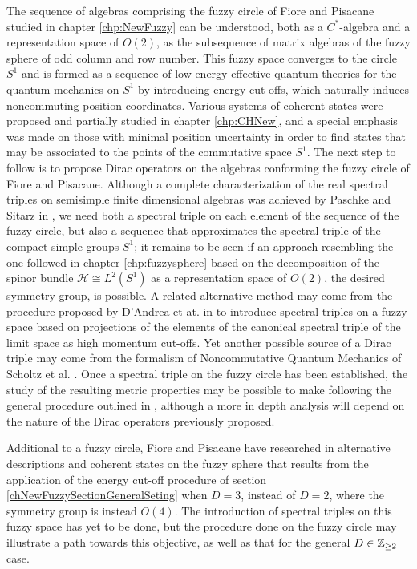 \documentclass[12pt]{report}
\theoremstyle{definition}
\newcommand{\hcal}{\mathcal H}
\begin{document}
The sequence of algebras comprising the fuzzy circle of Fiore and Pisacane studied in chapter \ref{chp:NewFuzzy} can be understood, both as a $C^*$-algebra and a representation space of $O(2)$, as the subsequence of matrix algebras of the fuzzy sphere of odd column and row number. This fuzzy space converges to the circle $S^1$ and is formed as a sequence of low energy effective quantum theories for the quantum mechanics on $S^1$ by introducing energy cut-offs, which naturally induces noncommuting position coordinates.
Various systems of coherent states were proposed and partially studied in chapter \ref{chp:CHNew}, and a special emphasis was made on those with minimal position uncertainty in order to find states that may be associated to the points of the commutative space $S^1$.
The next step to follow is to propose Dirac operators on the algebras conforming the fuzzy circle of Fiore and Pisacane. Although a complete characterization of the real spectral triples on semisimple finite dimensional algebras was achieved by Paschke and Sitarz in  \cite{PaschkeSitarz1998}, we need both a spectral triple on each element of the sequence of the fuzzy circle, but also a sequence that approximates the spectral triple of the compact simple groups $S^1$; it remains to be seen if an approach resembling the one followed in chapter \ref{chp:fuzzysphere} based on the decomposition of the spinor bundle $\hcal \cong L^2(S^1)$ as a representation space of $O(2)$, the desired symmetry group, is possible. A related alternative method may come from the procedure proposed by D'Andrea et at. in \cite{DAndrea2014} to introduce spectral triples on a fuzzy space based on projections of the elements of the canonical spectral triple of the limit space as high momentum cut-offs. Yet another possible source of a Dirac triple may come from the formalism of Noncommutative Quantum Mechanics of Scholtz et al. \cite{Scholtz2009,Scholtz2013}. Once a spectral triple on the fuzzy circle has been established, the study of the resulting metric properties may be possible to make following the general procedure outlined in \cite{ChaobaDevi2018}, although a more in depth analysis will depend on the nature of the Dirac operators previously proposed. 

Additional to a fuzzy circle, Fiore and Pisacane have researched in \cite{Fiore2018, FioreXi2020, FioreCoherent2020} alternative descriptions and coherent states on the fuzzy sphere that results from the application of the energy cut-off procedure of section \ref{chNewFuzzySectionGeneralSeting} when $D = 3$, instead of $D=2$, where the symmetry group is instead $O(4)$. The introduction of spectral triples on this fuzzy space has yet to be done, but the procedure done on the fuzzy circle may illustrate a path towards this objective, as well as that for the general $ D \in \mathbb{Z}_{\geq 2}$ case.


\printbibliography
\end{document}
